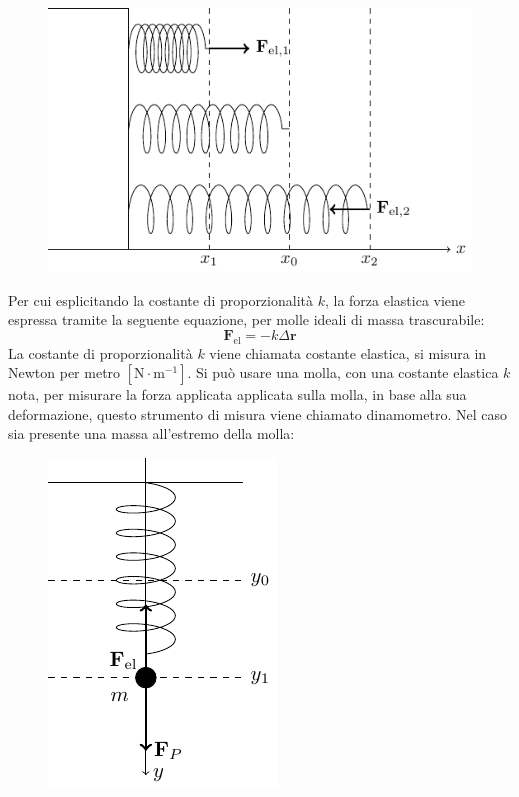 \documentclass{article}
\newcommand{\vect}[1]{\boldsymbol{\mathbf{#1}}}
\numberwithin{equation}{subsection}
\begin{document}
\begin{figure}[H]%
    \centering
    \includegraphics{molla-1.pdf}%
\end{figure}
    
Per cui esplicitando la costante di proporzionalità $k$, la forza elastica viene espressa tramite la seguente equazione, per molle ideali di massa trascurabile:
\begin{equation}
    \vect{F}_{\mathrm{el}}=-k\Delta\vect{r}
\end{equation}
La costante di proporzionalità $k$ viene chiamata costante 
elastica, si misura in Newton per metro $\left[\mathrm{N}\cdot\mathrm{m}^{-1}\right]$. 
Si può usare una molla, con una costante elastica $k$ 
nota, per misurare la forza applicata applicata sulla molla, 
in base alla sua deformazione, questo strumento di misura 
viene chiamato dinamometro. Nel caso sia 
presente una massa all'estremo della molla:

\begin{figure}[H]%
    \centering
    \includegraphics{molla-2.pdf}%
\end{figure}
\end{document}
